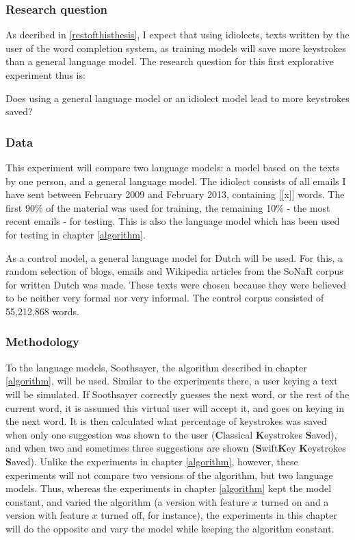 \documentclass[12pt]{article}
\begin{document}
\subsubsection{Research question}
As decribed in \ref{restofthisthesis}, I expect that using idiolects, texts written by the user of the word completion system, as training models will save more keystrokes than a general language model. The research question for this first explorative experiment thus is:

\begin{examples}

\item Does using a general language model or an idiolect model lead to more keystrokes saved?

\end{examples}

\subsubsection{Data} \label{data_simple}
This experiment will compare two language models: a model based on the texts by one person, and a general language model. The idiolect consists of all emails I have sent between February 2009 and February 2013, containing [[x]] words. The first 90\% of the material was used for training, the remaining 10\% - the most recent emails - for testing. This is also the language model which has been used for testing in chapter \ref{algorithm}. 

As a control model, a general language model for Dutch will be used. For this, a random selection of blogs, emails and Wikipedia articles from the SoNaR corpus for written Dutch  was made. These texts were chosen because they were believed to be neither very formal nor very informal. The control corpus consisted of 55,212,868 words.


\subsubsection{Methodology}
To the language models, Soothsayer, the algorithm described in chapter \ref{algorithm}, will be used. Similar to the experiments there, a user keying a text will be simulated. If Soothsayer correctly guesses the next word, or the rest of the current word, it is assumed this virtual user will accept it, and goes on keying in the next word. It is then calculated what percentage of keystrokes was saved when only one suggestion was shown to the user (\textbf{C}lassical \textbf{K}eystrokes \textbf{S}aved), and when two and sometimes three suggestions are shown (\textbf{S}wift\textbf{K}ey \textbf{K}eystrokes \textbf{S}aved). Unlike the experiments in chapter \ref{algorithm}, however, these experiments will not compare two versions of the algorithm, but two language models. Thus, whereas the experiments in chapter \ref{algorithm} kept the model constant, and varied the algorithm (a version with feature $x$ turned on and a version with feature $x$ turned off, for instance), the experiments in this chapter will do the opposite and vary the model while keeping the algorithm constant. 
\end{document}
